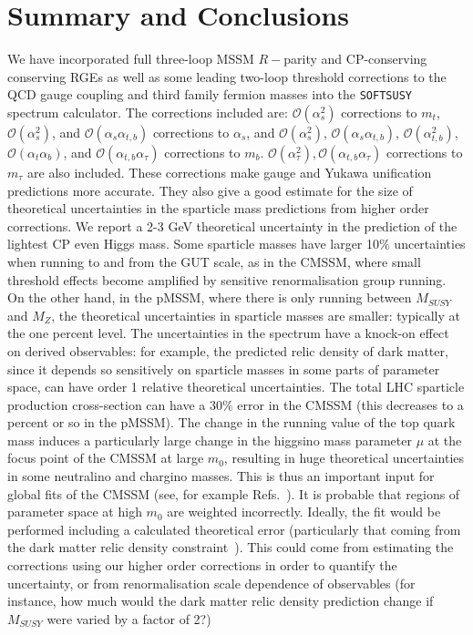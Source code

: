 \documentclass[final,3p,times,pdflatex]{elsarticle}
\begin{document}
\section{Summary and Conclusions}
 We have incorporated full three-loop MSSM $R-$parity and CP-conserving
 conserving RGEs as well as some leading two-loop 
 threshold corrections to the QCD gauge coupling and third family fermion
 masses into the {\tt SOFTSUSY} spectrum calculator. The corrections included
 are: $\mathcal O(\alpha_s^2)$ corrections to $m_t$, $\mathcal O(\alpha_s^2)$,
 and $\mathcal O(\alpha_s \alpha_{t,b})$ 
 corrections to $\alpha_s$, and $\mathcal O(\alpha_s^2)$, 
 $\mathcal O(\alpha_s \alpha_{t,b})$, $\mathcal O(\alpha_{t,b}^2)$, $\mathcal O(\alpha_t \alpha_b)$, and $\mathcal O(\alpha_{t,b} \alpha_\tau)$ corrections to
 $m_b$. $\mathcal O(\alpha_\tau^2), \mathcal O(\alpha_{t,b} \alpha_\tau)$ 
 corrections to $m_\tau$ are also included. These corrections make gauge and
 Yukawa unification  predictions more accurate. They also give a good estimate
 for the size of theoretical uncertainties in the sparticle mass predictions
 from higher order corrections. We report a 2-3 GeV theoretical uncertainty in
 the prediction  of 
 the lightest CP even Higgs mass. Some sparticle masses have larger 10$\%$
 uncertainties when running to and from the GUT scale, as in the CMSSM, where
 small threshold effects become amplified by sensitive renormalisation group
 running. On the other hand, in the pMSSM, where there is only running between
 $M_{SUSY}$ and $M_Z$, the theoretical uncertainties in sparticle masses are
 smaller: typically at the one percent level. The uncertainties in the spectrum
 have a knock-on effect on derived observables: for example, the predicted
 relic density of dark matter, since it depends so sensitively on sparticle
 masses in some parts of parameter space, can have order 1 relative theoretical
 uncertainties. The total LHC sparticle production cross-section can have a
 $30\%$ error in the CMSSM (this decreases to a percent or so in the pMSSM).
 The change in the running
 value of the top quark mass induces a particularly large change in the
 higgsino mass parameter $\mu$ at the focus point of the CMSSM at large $m_0$,
 resulting in 
 huge theoretical uncertainties in some neutralino and chargino masses. 
 This is thus an important input for global fits of the CMSSM (see, for example
Refs.~\cite{Buchmueller:2011ab,Allanach:2011wi,Roszkowski:2014wqa,Fowlie:2013oua}). It 
is probable that regions of parameter space at high 
$m_0$ are weighted 
incorrectly. Ideally, the fit would be performed including a calculated
 theoretical error (particularly that coming from the dark matter relic
 density constraint~\cite{Belanger:2005jk}). This could come from estimating
 the corrections using  
 our higher order corrections in order to quantify the uncertainty, or from
 renormalisation scale dependence of observables (for instance, how much would
 the dark matter relic density prediction change if $M_{SUSY}$ were varied by
 a factor of 2?)
\end{document}
